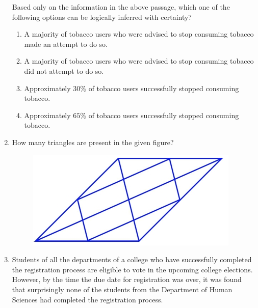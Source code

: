 \documentclass[journal,12pt,onecolumn]{IEEEtran}
\theoremstyle{remark}
\begin{document}
\begin{enumerate}
Based only on the information in the above passage, which one of the following options can be logically inferred with certainty?
\begin{enumerate}
\item A majority of tobacco users who were advised to stop consuming tobacco made an attempt to do so.
\item A majority of tobacco users who were advised to stop consuming tobacco did not attempt to do so.
\item Approximately $30\%$ of tobacco users successfully stopped consuming tobacco.
\item Approximately $65\%$ of tobacco users successfully stopped consuming tobacco.
\end{enumerate}
\hfill{}

\newpage

    

\item How many triangles are present in the given figure? \\
\begin{figure}[h]
    \centering
    \includegraphics[width=0.5\linewidth]{figs/img 1.jpeg}
    \caption{}
    \label{fig:placeholder}
\end{figure}


\begin{enumerate}
\end{enumerate}
\hfill{}
\item Students of all the departments of a college who have successfully completed the registration process are eligible to vote in the upcoming college elections. However, by the time the due date for registration was over, it was found that surprisingly none of the students from the Department of Human Sciences had completed the registration process. \\


\end{enumerate}
\end{document}

